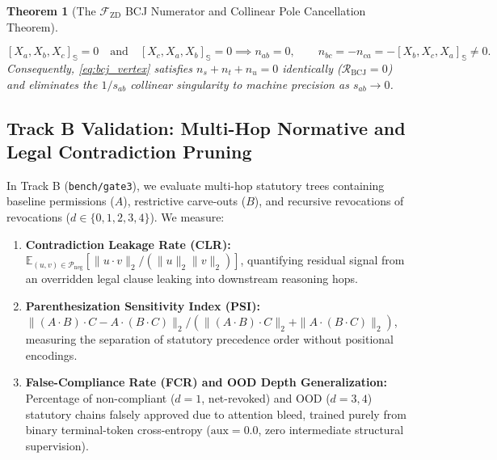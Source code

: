 \documentclass[11pt,a4paper]{article}
\newtheorem{theorem}{Theorem}[section]
\theoremstyle{definition}
\theoremstyle{remark}
\newcommand{\Se}{\mathbb{S}}
\newcommand{\Fzd}{\mathcal{F}_{\mathrm{ZD}}}
\begin{document}
\begin{theorem}[The $\Fzd$ BCJ Numerator and Collinear Pole Cancellation Theorem]
\begin{enumerate}
    \begin{equation}
    \label{eq:fzd_pole_cancel}
    [X_a, X_b, X_c]_{\Se} = 0 \quad \text{and} \quad [X_c, X_a, X_b]_{\Se} = 0 \implies n_{ab} = 0, \qquad n_{bc} = -n_{ca} = -[X_b, X_c, X_a]_{\Se} \neq 0.
    \end{equation}
    Consequently, \eqref{eq:bcj_vertex} satisfies $n_s + n_t + n_u = 0$ identically ($\mathcal{R}_{\mathrm{BCJ}} = 0$) and eliminates the $1 / s_{ab}$ collinear singularity to machine precision as $s_{ab} \to 0$.
\end{enumerate}
\end{theorem}

\subsection{Track B Validation: Multi-Hop Normative and Legal Contradiction Pruning}
In Track B (\texttt{bench/gate3}), we evaluate multi-hop statutory trees containing baseline permissions ($A$), restrictive carve-outs ($B$), and recursive revocations of revocations ($d \in \{0, 1, 2, 3, 4\}$). We measure:
\begin{enumerate}
    \item \textbf{Contradiction Leakage Rate (CLR):} $\mathbb{E}_{(u,v) \in \mathcal{P}_{\mathrm{neg}}}[\|u \cdot v\|_2 / (\|u\|_2 \|v\|_2)]$, quantifying residual signal from an overridden legal clause leaking into downstream reasoning hops.
    \item \textbf{Parenthesization Sensitivity Index (PSI):} $\|(A \cdot B) \cdot C - A \cdot (B \cdot C)\|_2 / (\|(A \cdot B) \cdot C\|_2 + \|A \cdot (B \cdot C)\|_2)$, measuring the separation of statutory precedence order without positional encodings.
    \item \textbf{False-Compliance Rate (FCR) and OOD Depth Generalization:} Percentage of non-compliant ($d=1$, net-revoked) and OOD ($d=3, 4$) statutory chains falsely approved due to attention bleed, trained purely from binary terminal-token cross-entropy ($\text{aux} = 0.0$, zero intermediate structural supervision).
\end{enumerate}
\end{document}
